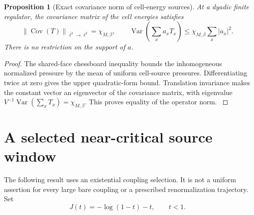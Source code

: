 \documentclass[11pt,oneside,openany]{book}
\newtheorem{proposition}[proposition]{Proposition}
\theoremstyle{definition}
\theoremstyle{remark}
\newcommand{\Var}{\operatorname{Var}}
\newcommand{\Cov}{\operatorname{Cov}}
\newcommand{\norm}[1]{\left\lVert#1\right\rVert}
\newcommand{\src}[2]{\cite[#2]{#1}}
\begin{document}
\begin{proposition}[Exact covariance norm of cell-energy sources]
\label{prop:full-Wilson-covariance}
At a dyadic finite regulator, the covariance matrix of the cell energies
satisfies
\begin{equation}
 \norm{\Cov(T)}_{\ell^2\to\ell^2}=\chi_{M,\beta},\qquad
 \Var\left(\sum_xa_xT_x\right)
                       \le\chi_{M,\beta}\sum_x|a_x|^2.
 \label{eq:full-Wilson-covariance}
\end{equation}
There is no restriction on the support of $a$.
\end{proposition}
\begin{proof}
The shared-face chessboard inequality bounds the inhomogeneous
normalized pressure by the mean of uniform cell-source pressures.
Differentiating twice at zero gives the upper quadratic-form bound.
Translation invariance makes the constant vector an eigenvector of
the covariance matrix, with eigenvalue
$V^{-1}\Var(\sum_xT_x)=\chi_{M,\beta}$. This proves equality of the
operator norm. \src{F14}{V98--V99}
\end{proof}

\section{A selected near-critical source window}
The following result uses an existential coupling selection. It is
not a uniform assertion for every large bare coupling or a prescribed
renormalization trajectory. Set
\[
 J(t)=-\log(1-t)-t,\qquad t<1.
\]
\end{document}
